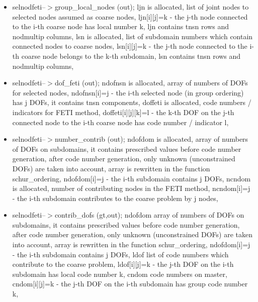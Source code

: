 \begin{itemize}
\item
selnodfeti--$>$group\_local\_nodes (out);
\newline
ljn is allocated,
list of joint nodes to selected nodes assumed as coarse nodes,
ljn[i][j]=k - the j-th node connected to the i-th coarse node has local number k,
ljn contains tnsn rows and nodmultip columns,
\newline
lsn is allocated,
list of subdomain numbers which contain connected nodes to coarse nodes,
lsn[i][j]=k - the j-th node connected to the i-th coarse node belongs to the k-th subdomain,
lsn contains tnsn rows and nodmultip columns,


\item
selnodfeti--$>$dof\_feti (out);
\newline
ndofnsn is allocated,
array of numbers of DOFs for selected nodes,
ndofnsn[i]=j - the i-th selected node (in group ordering) has j DOFs,
it contains tnsn components,
\newline
doffeti is allocated,
code numbers / indicators for FETI method,
doffeti[i][j][k]=l - the k-th DOF on the j-th connected node to the i-th coarse node has code number / indicator l,

\item
selnodfeti--$>$number\_contrib (out);
\newline
ndofdom is allocated,
array of numbers of DOFs on subdomains,
it contains prescribed values before code number generation,
after code number generation, only unknown (unconstrained DOFs) are taken into account,
array is rewritten in the function schur\_ordering,
ndofdom[i]=j - the i-th subdomain contains j DOFs,
\newline
ncndom is allocated,
number of contributing nodes in the FETI method,
ncndom[i]=j - the i-th subdomain contributes to the coarse problem by j nodes,

\item
selnodfeti--$>$contrib\_dofs (gt,out);
\newline
ndofdom
array of numbers of DOFs on subdomains,
it contains prescribed values before code number generation,
after code number generation, only unknown (unconstrained DOFs) are taken into account,
array is rewritten in the function schur\_ordering,
ndofdom[i]=j - the i-th subdomain contains j DOFs,
\newline
ldof
list of code numbers which contribute to the coarse problem,
ldof[i][j]=k - the j-th DOF on the i-th subdomain has local code number k,
\newline
cndom
code numbers on master,
cndom[i][j]=k - the j-th DOF on the i-th subdomain has group code number k,



\end{itemize}
